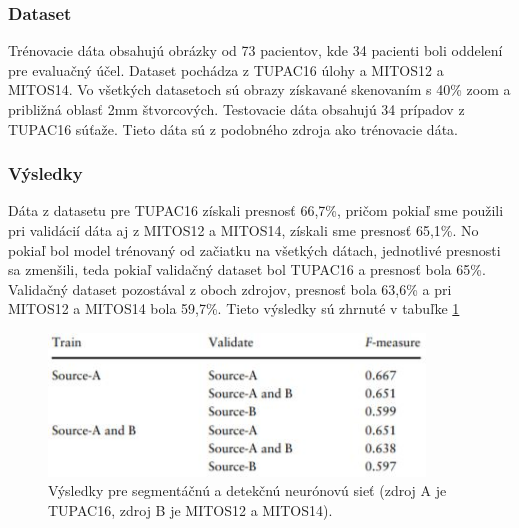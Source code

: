 \subsubsection*{Dataset}
\hspace{10mm}Trénovacie dáta obsahujú obrázky od 73 pacientov, kde 34 pacienti boli oddelení pre evaluačný účel. Dataset pochádza z TUPAC16 úlohy a MITOS12 a MITOS14. Vo všetkých datasetoch sú obrazy získavané skenovaním s 40\% zoom a približná oblasť 2mm štvorcových. Testovacie dáta obsahujú 34 prípadov z TUPAC16 súťaže. Tieto dáta sú z podobného zdroja ako trénovacie dáta.

\subsubsection*{Výsledky} 
\hspace{10mm}Dáta z datasetu pre TUPAC16 získali presnosť 66,7\%, pričom pokiaľ sme použili pri validácií dáta aj z MITOS12 a MITOS14, získali sme presnosť 65,1\%. No pokiaľ bol model trénovaný od začiatku na všetkých dátach,  jednotlivé presnosti sa zmenšili, teda pokiaľ validačný dataset bol TUPAC16 a presnosť bola 65\%. Validačný dataset pozostával z oboch zdrojov, presnosť bola 63,6\% a pri MITOS12 a MITOS14 bola 59,7\%. Tieto výsledky sú zhrnuté v tabuľke \ref{fig:SegaDetNN} 

\begin{figure}[h!]
\begin{centering}
\includegraphics[width=10cm]{assets/images/253_2.JPG}
\par\end{centering}
\caption{Výsledky pre segmentáčnú a detekčnú neurónovú sieť (zdroj A je TUPAC16, zdroj B je MITOS12 a MITOS14). \label{fig:SegaDetNN}\cite{10.1093/jmicro/dfz002}}
\end{figure}

\cite{10.1093/jmicro/dfz002}
